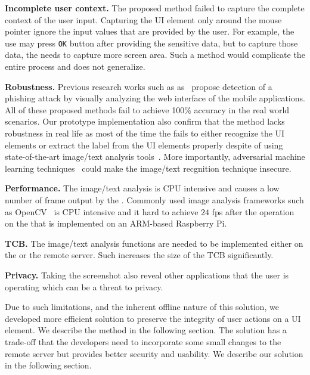 \begin{mylist}
  \item \textbf{Incomplete user context.} The proposed method failed to capture the complete context of the user input. Capturing the UI element only around the mouse pointer ignore the input values that are provided by the user. For example, the use may press \texttt{OK} button after providing the sensitive data, but to capture those data, the \device needs to capture more screen area. Such a method would complicate the entire process and does not generalize.
  \item \textbf{Robustness.} Previous research works such as as~\cite{lukaSpoof,Chen:2010:DVS:1754393.1754394} propose detection of a phishing attack by visually analyzing the web interface of the mobile applications. All of these proposed methods fail to achieve 100\% accuracy in the real world scenarios. Our prototype implementation also confirm that the method lacks robustness in real life as most of the time the \device fails to either recognize the UI elements or extract the label from the UI elements properly despite of using state-of-the-art image/text analysis tools~\cite{opencv}. More importantly, adversarial machine learning techniques~\cite{eykholt2017robust,sitawarin2018rogue} could make the image/text recgnition technique insecure.
  \item \textbf{Performance.} The image/text analysis is CPU intensive and causes a low number of frame output by the \device. Commonly used image analysis frameworks such as OpenCV~\cite{opencv} is CPU intensive and it hard to achieve $24$ fps after the operation on the \device that is implemented on an ARM-based Raspberry Pi.
  \item \textbf{TCB.} The image/text analysis functions are needed to be implemented either on the \device or the remote server. Such increases the size of the TCB significantly.
  \item \textbf{Privacy.} Taking the screenshot also reveal other applications that the user is operating which can be a threat to privacy.
\end{mylist}

Due to such limitations, and the inherent offline nature of this solution, we developed more efficient solution to preserve the integrity of user actions on a UI element. We describe the method in the following section. The solution has a trade-off that the developers need to incorporate some small changes to the remote server but provides better security and usability. We describe our solution in the following section.

